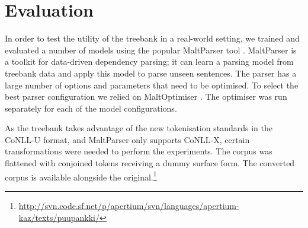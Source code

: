 \documentclass[a4paper,11pt, onecolumn,twoside]{article}
\begin{document}

\section{Evaluation}\label{sec:eval}

In order to test the utility of the treebank in a real-world setting, we trained
and evaluated a number of models using the popular MaltParser tool \parencite{nivre07}.
MaltParser is a toolkit for data-driven dependency parsing; it can learn a parsing
model from treebank data and apply this model to parse unseen sentences. The parser
has a large number of options and parameters that need to be optimised. 
To select the best parser configuration we relied on 
MaltOptimiser \parencite{ballesteros15}. The optimiser was run separately for each of 
the model configurations.

As the treebank takes advantage of the new tokenisation standards in the CoNLL-U format,
and MaltParser only supports CoNLL-X, certain transformations were needed to perform 
the experiments. The corpus was flattened with conjoined tokens receiving a dummy 
surface form. The converted corpus is available alongside the original.\footnote{\url{http://svn.code.sf.net/p/apertium/svn/languages/apertium-kaz/texts/puupankki/}}





\end{document}
